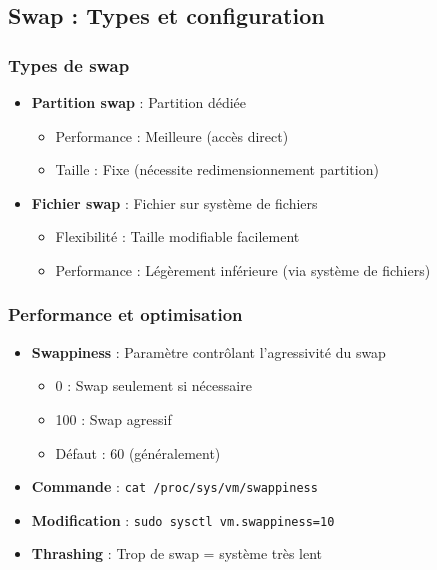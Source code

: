 \documentclass[12pt,a4paper]{article}
\begin{document}
\subsection{Swap : Types et configuration}

\subsubsection{Types de swap}

\begin{itemize}
    \item \textbf{Partition swap} : Partition dédiée
    \begin{itemize}
        \item Performance : Meilleure (accès direct)
        \item Taille : Fixe (nécessite redimensionnement partition)
    \end{itemize}
    \item \textbf{Fichier swap} : Fichier sur système de fichiers
    \begin{itemize}
        \item Flexibilité : Taille modifiable facilement
        \item Performance : Légèrement inférieure (via système de fichiers)
    \end{itemize}
\end{itemize}

\subsubsection{Performance et optimisation}

\begin{itemize}
    \item \textbf{Swappiness} : Paramètre contrôlant l'agressivité du swap
    \begin{itemize}
        \item 0 : Swap seulement si nécessaire
        \item 100 : Swap agressif
        \item Défaut : 60 (généralement)
    \end{itemize}
    \item \textbf{Commande} : \texttt{cat /proc/sys/vm/swappiness}
    \item \textbf{Modification} : \texttt{sudo sysctl vm.swappiness=10}
    \item \textbf{Thrashing} : Trop de swap = système très lent
\end{itemize}
\end{document}
